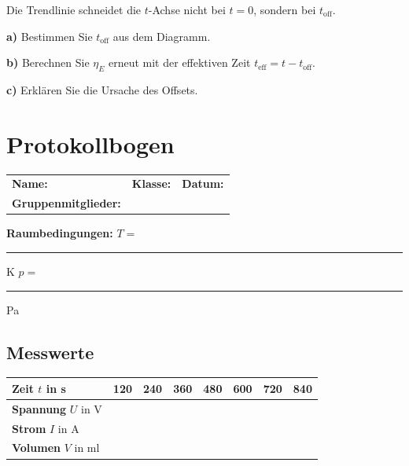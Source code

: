 \documentclass[11pt,a4paper]{scrartcl}
\begin{document}
	\begin{sternaufgabe}[title={\faIcon{star} Aufgabe 4: Offset-Korrektur}]
		Die Trendlinie schneidet die $t$-Achse nicht bei $t=0$, sondern bei $t_{\text{off}}$.
		
		\textbf{a)} Bestimmen Sie $t_{\text{off}}$ aus dem Diagramm.
		
		\textbf{b)} Berechnen Sie $\eta_E$ erneut mit der effektiven Zeit $t_{\text{eff}} = t - t_{\text{off}}$.
		
		\textbf{c)} Erklären Sie die Ursache des Offsets.
	\end{sternaufgabe}
	
	\newpage
	\section*{Protokollbogen}
	
	\begin{center}
		\begin{tcolorbox}[colback=white, colframe=black, width=\textwidth, boxrule=0.5pt]
			\begin{tabular}{@{}p{0.32\textwidth}p{}p{}@{}}
				\textbf{Name:} \hrulefill & \textbf{Klasse:} \hrulefill & \textbf{Datum:} \hrulefill \\[0.4cm]
				\textbf{Gruppenmitglieder:} & \multicolumn{2}{l}{\hrulefill} \\
			\end{tabular}
		\end{tcolorbox}
	\end{center}
	
	\textbf{Raumbedingungen:} \quad $T = $ \rule{2cm}{0.4pt} K \qquad $p = $ \rule{2cm}{0.4pt} Pa
	
	\subsection*{Messwerte}
	
	\begin{center}
		\renewcommand{\arraystretch}{2.2}
		\begin{tabular}{|p{2.5cm}|p{1.4cm}|p{1.4cm}|p{1.4cm}|p{1.4cm}|p{1.4cm}|p{1.4cm}|p{1.4cm}|}
			\hline
			\textbf{Zeit} $t$ in s & 120 & 240 & 360 & 480 & 600 & 720 & 840 \\
			\hline
			\textbf{Spannung} $U$ in V & & & & & & & \\
			\hline
			\textbf{Strom} $I$ in A & & & & & & & \\
			\hline
			\textbf{Volumen} $V$ in ml & & & & & & & \\
			\hline
		\end{tabular}
	\end{center}
	
\end{document}
